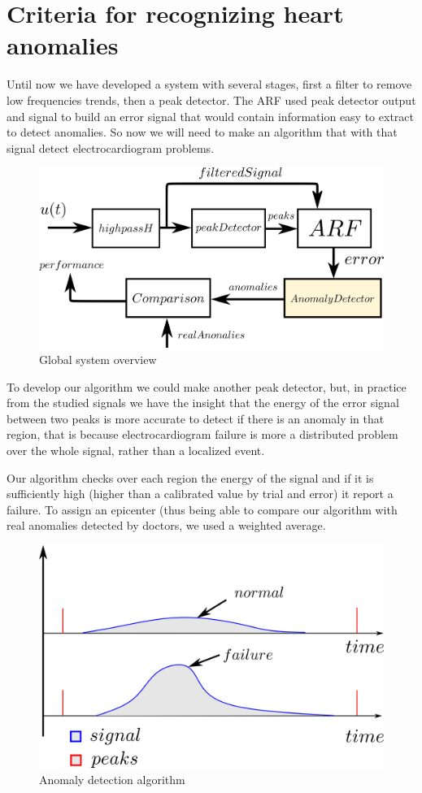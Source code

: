 \documentclass[conference]{IEEEtran}
\begin{document}
\section{Criteria for recognizing heart anomalies}
Until now we have developed a system with several stages, first a filter to remove low frequencies trends, then a peak detector. The ARF used peak detector output and signal to build an error signal that would contain information easy to extract to detect anomalies.
So now we will need to make an algorithm that with that signal detect electrocardiogram problems.
\begin{figure}[H]
\centerline{\includegraphics[scale=0.55]{imagenes/diagram}}
\caption{Global system overview}
\label{fig}
\end{figure}
To develop our algorithm we could make another peak detector, but, in practice from the studied signals we have the insight that the energy of the error signal between two peaks is more accurate to detect if there is an anomaly in that region, that is because electrocardiogram failure is more a distributed problem over the whole signal, rather than a localized event.

Our algorithm checks over each region the energy of the signal and if it is sufficiently high (higher than a calibrated value by trial and error) it report a failure. To assign an epicenter (thus being able to compare our algorithm with real anomalies detected by doctors, we used a weighted average.

\begin{figure}[H]
\centerline{\includegraphics[scale=0.7]{imagenes/anomalyAlgo}}
\caption{Anomaly detection algorithm}
\label{fig}
\end{figure}
\end{document}
